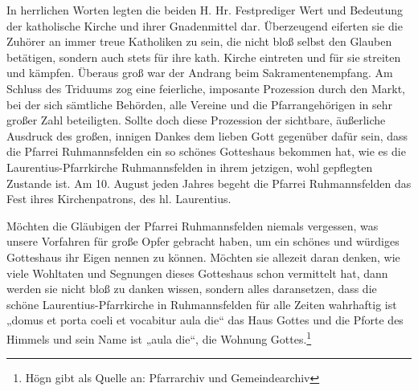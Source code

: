\documentclass[12pt,a4paper]{book}
\begin{document}
In herrlichen Worten legten die beiden H. Hr. Festprediger Wert und Bedeutung
der katholische Kirche und ihrer Gnadenmittel dar. Überzeugend eiferten sie die
Zuhörer an immer treue Katholiken zu sein, die nicht bloß selbst den Glauben
betätigen, sondern auch stets für ihre kath. Kirche eintreten und für sie
streiten und kämpfen. Überaus groß war der Andrang beim Sakramentenempfang. Am
Schluss des Triduums zog eine feierliche, imposante Prozession durch den Markt,
bei der sich sämtliche Behörden, alle Vereine und die Pfarrangehörigen in sehr
großer Zahl beteiligten. Sollte doch diese Prozession der sichtbare, äußerliche
Ausdruck des großen, innigen Dankes dem lieben Gott gegenüber dafür sein, dass
die Pfarrei Ruhmannsfelden ein so schönes Gotteshaus bekommen hat, wie es die
Laurentius-Pfarrkirche Ruhmannsfelden in ihrem jetzigen, wohl gepflegten
Zustande ist. Am 10. August jeden Jahres begeht die Pfarrei Ruhmannsfelden das
Fest ihres Kirchenpatrons, des hl. Laurentius.

Möchten die Gläubigen der Pfarrei Ruhmannsfelden niemals vergessen, was unsere
Vorfahren für große Opfer gebracht haben, um ein schönes und würdiges Gotteshaus
ihr Eigen nennen zu können. Möchten sie allezeit daran denken, wie viele
Wohltaten und Segnungen dieses Gotteshaus schon vermittelt hat, dann werden sie
nicht bloß zu danken wissen, sondern alles daransetzen, dass die schöne
Laurentius-Pfarrkirche in Ruhmannsfelden für alle Zeiten wahrhaftig ist „domus
et porta coeli et vocabitur aula die“ das Haus Gottes und die Pforte des Himmels
und sein Name ist „aula die“, die Wohnung Gottes.\footnote{Högn gibt als Quelle
an: Pfarrarchiv und Gemeindearchiv}
\end{document}
